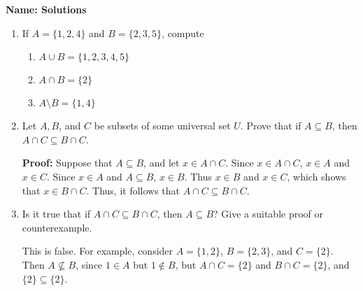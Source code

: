 \documentclass[12pt]{article}
\newcommand{\points}[1]{\marginpar{\hspace{24pt}[#1]}}
\begin{document}
{\bf Name: Solutions}
\thispagestyle{fancy}

\bigskip

\begin{enumerate}
 \item If $A=\{1,2,4\}$ and $B=\{2,3,5\}$, compute
\begin{enumerate}
 \item $A\cup B = \{1,2,3,4,5\}$\points{1}

\vspace{0.5in}

 \item $A\cap B = \{2\}$ \points{1}

\vspace{0.5in}

 \item $A\setminus B = \{1,4\}$ \points{1}

\vspace{0.5in}
\end{enumerate}
\item Let $A, B$, and $C$ be subsets of some universal set $U$. Prove that if $A\subseteq B$, then\\
 $A\cap C\subseteq B\cap C$. \points{4}

\bigskip

{\bf Proof:} Suppose that $A\subseteq B$, and let $x\in A\cap C$. Since $x\in A\cap C$, $x\in A$ and $x\in C$. Since $x\in A$ and $A\subseteq B$, $x\in B$. Thus $x\in B$ and $x\in C$, which shows that $x\in B\cap C$. Thus, it follows that $A\cap C\subseteq B\cap C$.

\bigskip

\item Is it true that if $A\cap C\subseteq B\cap C$, then $A\subseteq B$? Give a suitable proof or counterexample. \points{3}

\bigskip

This is false. For example, consider $A=\{1,2\}$, $B=\{2,3\}$, and $C=\{2\}$. Then $A\nsubseteq B$, since $1\in A$ but $1\notin B$, but $A\cap C = \{2\}$ and $B\cap C=\{2\}$, and $\{2\}\subseteq \{2\}$.
\end{enumerate}
\end{document}
